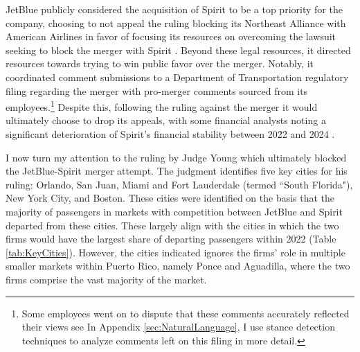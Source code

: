 \documentclass{article}
\begin{document}
	JetBlue publicly considered the acquisition of Spirit to be a top priority for the company, choosing to not appeal the ruling blocking its Northeast Alliance with American Airlines in favor of focusing its resources on overcoming the lawsuit seeking to block the merger with Spirit \citep{aratani_jetblue_2023}. Beyond these legal resources, it directed resources towards trying to win public favor over the merger. Notably, it coordinated comment submissions to a Department of Transportation regulatory filing regarding the merger with pro-merger comments sourced from its employees.\footnote{Some employees went on to dispute that these comments accurately reflected their views see \citet{birnbaum_elizabeth_2023, birnbaum_jet-blue_2023} In Appendix \ref{sec:NaturalLanguage}, I use stance detection techniques to analyze comments left on this filing in more detail.} Despite this, following the ruling against the merger it would ultimately choose to drop its appeals, with some financial analysts noting a significant deterioration of Spirit's financial stability between 2022 and 2024 \citep{sider_jetblue_2024}. 
	
	I now turn my attention to the ruling by Judge Young which ultimately blocked the JetBlue-Spirit merger attempt. The judgment identifies five key cities for his ruling: Orlando, San Juan, Miami and Fort Lauderdale (termed ``South Florida"), New York City, and Boston. These cities were identified on the basis that the majority of passengers in markets with competition between JetBlue and Spirit departed from these cities. These largely align with the cities in which the two firms would have the largest share of departing passengers within 2022 (Table \ref{tab:KeyCities}). However, the cities indicated ignores the firms' role in multiple smaller markets within Puerto Rico, namely Ponce and Aguadilla, where the two firms comprise the vast majority of the market. 
	
\end{document}
